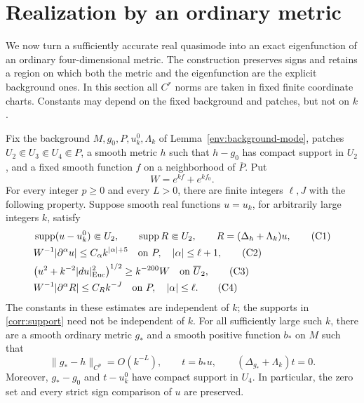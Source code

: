 \section{Realization by an ordinary metric}
\label{sec:correction}

We now turn a sufficiently accurate real quasimode into an exact
eigenfunction of an ordinary four-dimensional metric.  The construction
preserves signs and retains a region on which both the metric and the
eigenfunction are the explicit background ones.  In this section all
\(C^r\) norms are taken in fixed finite coordinate charts.  Constants
may depend on the fixed background and patches, but not on \(k\).

\begin{lemma}\label{corr:realization}
Fix the background \(M,g_0,P,u_k^0,\Lambda_k\) of
Lemma~\ref{env:background-mode}, patches
\(U_2\Subset U_3\Subset U_4\Subset P\), a smooth metric \(h\) such that
\(h-g_0\) has compact support in \(U_2\), and a fixed smooth function
\(f\) on a neighborhood of \(\overline P\).  Put
\[
 W=e^{kf}+e^{kf_0}.
\]
For every integer \(p\ge0\) and every \(L>0\), there are finite
integers \(\ell,J\) with the following property.  Suppose smooth real
functions \(u=u_k\), for arbitrarily large integers \(k\), satisfy
\begin{align}
 &\operatorname{supp}(u-u_k^0)\Subset U_2,
 \qquad \operatorname{supp} R\Subset U_2,
 \qquad R=(\Delta_h+\Lambda_k)u, \label{corr:support}\tag{C1}\\
 &W^{-1}|\partial^\alpha u|
       \le C_\alpha k^{|\alpha|+5}
       \quad\hbox{on }P,\quad |\alpha|\le\ell+1,
       \label{corr:derivatives}\tag{C2}\\
 &\bigl(u^2+k^{-2}|du|_{\mathrm{Euc}}^2\bigr)^{1/2}
       \ge k^{-200}W
       \quad\hbox{on }\overline U_2,\label{corr:noncancellation}\tag{C3}\\
 &W^{-1}|\partial^\alpha R|
       \le C_R k^{-J}
       \quad\hbox{on }P,\quad |\alpha|\le\ell.
       \label{corr:residual}\tag{C4}
\end{align}
The constants in these estimates are independent of \(k\); the supports
in \eqref{corr:support} need not be independent of \(k\).
For all sufficiently large such \(k\), there are a smooth ordinary
metric \(g_*\) and a smooth positive function \(b_*\) on \(M\) such that
\[
 \|g_*-h\|_{C^p}=O(k^{-L}),\qquad
 t=b_*u,\qquad (\Delta_{g_*}+\Lambda_k)t=0.
\]
Moreover, \(g_*-g_0\) and \(t-u_k^0\) have compact support in \(U_4\).
In particular, the zero set and every strict sign comparison of \(u\)
are preserved.
\end{lemma}

